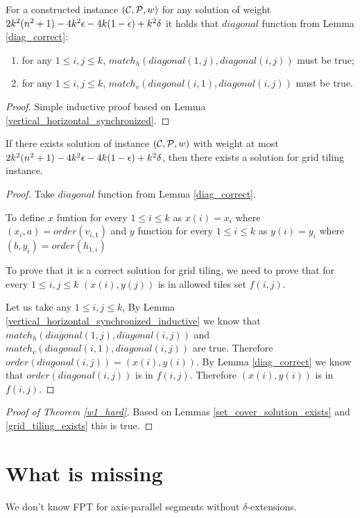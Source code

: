 \begin{corollary}
\label{vertical_horizontal_synchronized_inductive}
For a constructed instance $(\mathcal{C}, \mathcal{P}, w)$
for any solution of weight $2k^2(n^2+1) - 4k^2\epsilon -4k(1-\epsilon) +k^2\delta$ it holds that $diagonal$ function
from Lemma \ref{diag_correct}:
\begin{enumerate}
\item 
for any $1 \le i, j \le k$,
$match_h(diagonal(1, j),diagonal(i, j))$ must be true;
\item 
for any $1 \le i, j \le k$,
$match_v(diagonal(i, 1),diagonal(i, j))$ must be true.
\end{enumerate}
\end{corollary}
\begin{proof}
Simple inductive proof based on Lemma \ref{vertical_horizontal_synchronized}.
\end{proof}

\begin{lemma}
\label{grid_tiling_exists}
	If there exists solution of instance $(\mathcal{C}, \mathcal{P}, w)$
	with weight at most $2k^2(n^2+1) - 4k^2\epsilon -4k(1-\epsilon) +k^2\delta$,
	then there exists a solution for grid tiling instance.
\end{lemma}

\begin{proof}
Take $diagonal$ function from Lemma \ref{diag_correct}.

To define $x$ funtion 
for every $1 \le i \le k$ as $x(i) = x_i$
where $(x_i, a) = order(v_{i,1})$
and $y$ function 
for every $1 \le i \le k$ as $y(i) = y_i$
where $(b, y_i) = order(h_{1,i})$

To prove that it is a correct solution for grid tiling,
we need to prove that 
for every $1 \le i,j \le k$ $(x(i), y(j))$ is in
allowed tiles set $f(i,j)$.

Let us take any $1 \le i,j \le k$,
By Lemma \ref{vertical_horizontal_synchronized_inductive}
we know that $match_h(diagonal(1, j),diagonal(i, j))$ and
$match_v(diagonal(i, 1),diagonal(i, j))$ are true.
Therefore $order(diagonal(i,j)) = (x(i), y(i))$.
By Lemma \ref{diag_correct} we know that 
$order(diagonal(i,j))$ is in $f(i,j)$.
Therefore 
$(x(i), y(i))$
is in $f(i,j)$.

\end{proof}

\begin{proof}[Proof of Theorem \ref{w1_hard}]
Based on Lemmas \ref{set_cover_solution_exists} and \ref{grid_tiling_exists}
this is true.
\end{proof}


\section{What is missing}
We don't know FPT for axis-parallel segments without $\delta$-extensions.
